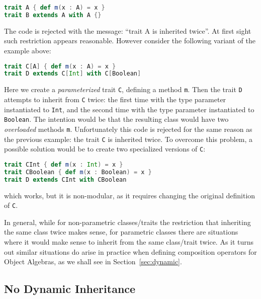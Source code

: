\begin{lstlisting}[language=scala]
trait A { def m(x : A) = x }
trait B extends A with A {}
\end{lstlisting}

\noindent The code is rejected with the message: ``trait A is
inherited twice''. At first sight such restriction appears
reasonable. However consider the following variant of the example 
above:

\begin{lstlisting}[language=scala]
trait C[A] { def m(x : A) = x }
trait D extends C[Int] with C[Boolean]
\end{lstlisting}

\noindent Here we create a \emph{parameterized} trait \lstinline{C},
defining a method \lstinline{m}. Then the trait \lstinline{D} attempts 
to inherit from \lstinline{C} twice: the first time with the type
parameter instantiated to \lstinline{Int}, and the second time with
the type parameter instantiated to \lstinline{Boolean}. The intention 
would be that the resulting class would have two \emph{overloaded}
methods \lstinline{m}. Unfortunately this code is rejected for the
same reason as the previous example: the trait \lstinline{C} is
inherited twice. To overcome this problem, a possible solution would
be to create two specialized versions of \lstinline{C}:

\begin{lstlisting}[language=scala]
trait CInt { def m(x : Int) = x }
trait CBoolean { def m(x : Boolean) = x }
trait D extends CInt with CBoolean
\end{lstlisting}

\noindent which works, but it is non-modular, as it requires changing 
the original definition of \lstinline{C}. 

In general, while for non-parametric classes/traits the restriction
that inheriting the same class twice makes sense, for parametric
classes there are situations where it would make sense to inherit 
from the same class/trait twice. As it turns out similar situations 
do arise in practice when defining composition operators for
Object Algebras, as we shall see in Section~\ref{sec:dynamic}.

\subsection{No Dynamic Inheritance}
\label{sec:scala-merge}

